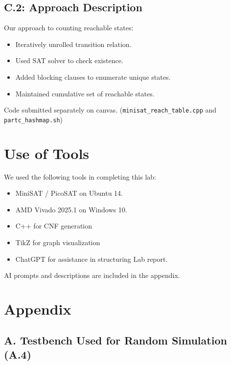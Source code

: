 \documentclass[10pt]{article}
\begin{document}
\subsection*{C.2: Approach Description}

Our approach to counting reachable states:

\begin{itemize}
\item Iteratively unrolled transition relation.
\item Used SAT solver to check existence.
\item Added blocking clauses to enumerate unique states.
\item Maintained cumulative set of reachable states.
\end{itemize}

Code submitted separately on canvas. (\texttt{minisat\_reach\_table.cpp} and \texttt{partc\_hashmap.sh})


\section*{Use of Tools}

We used the following tools in completing this lab:

\begin{itemize}
\item MiniSAT / PicoSAT on Ubuntu 14.
\item AMD Vivado 2025.1 on Windows 10.
\item C++ for CNF generation
\item TikZ for graph visualization
\item ChatGPT for assistance in structuring Lab report.
\end{itemize}

AI prompts and descriptions are included in the appendix.


\appendix
\section*{Appendix}

\subsection*{A. Testbench Used for Random Simulation (A.4)}
\end{document}
